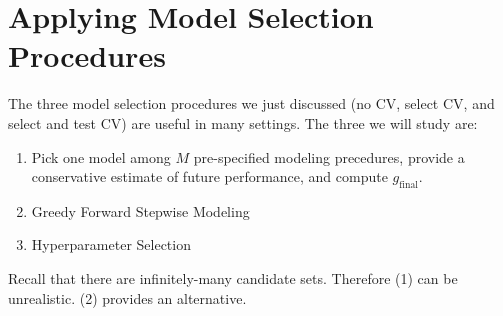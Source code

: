 \documentclass[12pt, a4paper]{article}
\theoremstyle{definition}
\begin{document}
	\section*{Applying Model Selection Procedures}
	The three model selection procedures we just discussed (no CV, select CV, and
	select and test CV) are useful in many settings. The three we will study are:
	\begin{enumerate}[label=(\arabic*)]
		\item Pick one model among $M$ pre-specified modeling precedures, provide
		a conservative estimate of future performance, and compute $g_{\text{final}}$.
		\item Greedy Forward Stepwise Modeling
		\item Hyperparameter Selection
	\end{enumerate}
	Recall that there are infinitely-many candidate sets. Therefore (1) can be unrealistic.
	(2) provides an alternative.
\end{document}
